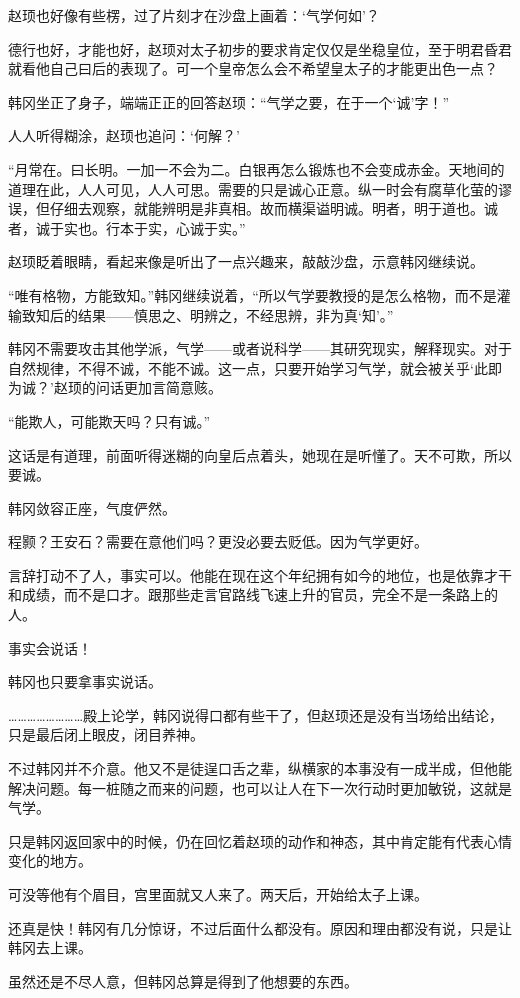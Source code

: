 赵顼也好像有些楞，过了片刻才在沙盘上画着：‘气学何如’？

德行也好，才能也好，赵顼对太子初步的要求肯定仅仅是坐稳皇位，至于明君昏君就看他自己曰后的表现了。可一个皇帝怎么会不希望皇太子的才能更出色一点？

韩冈坐正了身子，端端正正的回答赵顼：“气学之要，在于一个‘诚’字！”

人人听得糊涂，赵顼也追问：‘何解？’

“月常在。曰长明。一加一不会为二。白银再怎么锻炼也不会变成赤金。天地间的道理在此，人人可见，人人可思。需要的只是诚心正意。纵一时会有腐草化萤的谬误，但仔细去观察，就能辨明是非真相。故而横渠谥明诚。明者，明于道也。诚者，诚于实也。行本于实，心诚于实。”

赵顼眨着眼睛，看起来像是听出了一点兴趣来，敲敲沙盘，示意韩冈继续说。

“唯有格物，方能致知。”韩冈继续说着，“所以气学要教授的是怎么格物，而不是灌输致知后的结果——慎思之、明辨之，不经思辨，非为真‘知’。”

韩冈不需要攻击其他学派，气学——或者说科学——其研究现实，解释现实。对于自然规律，不得不诚，不能不诚。这一点，只要开始学习气学，就会被关乎‘此即为诚？’赵顼的问话更加言简意赅。

“能欺人，可能欺天吗？只有诚。”

这话是有道理，前面听得迷糊的向皇后点着头，她现在是听懂了。天不可欺，所以要诚。

韩冈敛容正座，气度俨然。

程颢？王安石？需要在意他们吗？更没必要去贬低。因为气学更好。

言辞打动不了人，事实可以。他能在现在这个年纪拥有如今的地位，也是依靠才干和成绩，而不是口才。跟那些走言官路线飞速上升的官员，完全不是一条路上的人。

事实会说话！

韩冈也只要拿事实说话。

……………………殿上论学，韩冈说得口都有些干了，但赵顼还是没有当场给出结论，只是最后闭上眼皮，闭目养神。

不过韩冈并不介意。他又不是徒逞口舌之辈，纵横家的本事没有一成半成，但他能解决问题。每一桩随之而来的问题，也可以让人在下一次行动时更加敏锐，这就是气学。

只是韩冈返回家中的时候，仍在回忆着赵顼的动作和神态，其中肯定能有代表心情变化的地方。

可没等他有个眉目，宫里面就又人来了。两天后，开始给太子上课。

还真是快！韩冈有几分惊讶，不过后面什么都没有。原因和理由都没有说，只是让韩冈去上课。

虽然还是不尽人意，但韩冈总算是得到了他想要的东西。

